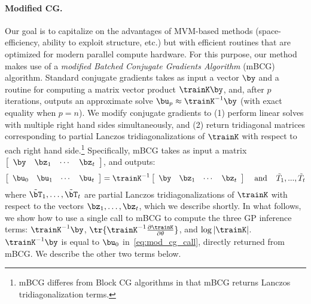 \paragraph{Modified CG.}
Our goal is to capitalize on the advantages of MVM-based methods (space-efficiency, ability to exploit structure, etc.) but with efficient routines that are optimized for modern parallel compute hardware.
For this purpose, our method makes use of a \emph{modified Batched Conjugate Gradients Algorithm} (mBCG) algorithm.
Standard conjugate gradients takes as input a vector $\by$ and a routine for computing a matrix vector product $\trainK\by$, and, after $p$ iterations, outputs an approximate solve $\bu_{p} \approx \trainK^{-1}\by$ (with exact equality when $p = n$).
We modify conjugate gradients to (1) perform linear solves with multiple right hand sides simultaneously, and (2) return tridiagonal matrices corresponding to partial Lanczos tridiagonalizations of $\trainK$ with respect to each right hand side.\footnote{
  mBCG differes from Block CG algorithms \cite{o1980block} in that mBCG returns Lanczos tridiagonalization terms.
} Specifically, mBCG takes as input a matrix $\left[\begin{array}{cccc}\by & \bz_{1} & \cdots & \bz_{t}\end{array}\right]$, and outputs:
\begin{equation}
  \label{eq:mod_cg_call}
  \left[\begin{array}{cccc}\bu_{0} & \bu_{1} & \cdots & \bu_{t}\end{array}\right] = \trainK^{-1}\left[\begin{array}{cccc}\by & \bz_{1} & \cdots & \bz_{t}\end{array}\right]\;\;\;\;\textrm{and}\;\;\;\; \tilde{T}_{1},...,\tilde{T}_{t}
\end{equation}
where $\tilde{\bT}_{1},\ldots,\tilde{\bT}_{t}$ are partial Lanczos tridiagonalizations of $\trainK$ with respect to the vectors $\bz_{1},\ldots,\bz_{t}$, which we describe shortly.
In what follows, we show how to use a single call to mBCG to compute the three GP inference terms: $\trainK^{-1} \by$, $\tr{ \trainK^{-1} \frac{\partial \trainK}{\partial \theta} }$, and $\log \vert \trainK \vert$.
%
$\trainK^{-1}\by$ is equal to $\bu_{0}$ in~\eqref{eq:mod_cg_call}, directly returned from mBCG. We describe the other two terms below.
%


